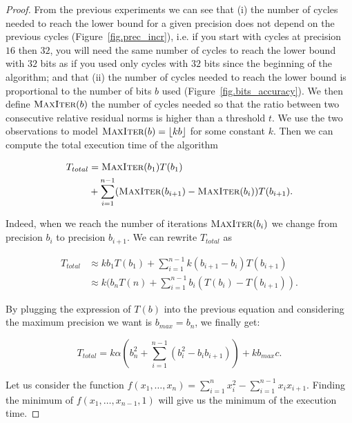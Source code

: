 \begin{proof}

    From the previous experiments we can see that (i) the number of cycles
    needed to reach the lower bound for a given precision does not depend on
    the previous cycles (Figure~\ref{fig.prec_incr}), i.e.  if you start with
    cycles at precision $16$ then $32$, you will need the same number of cycles
    to reach the lower bound with $32$ bits as if you used only cycles with
    $32$ bits since the beginning of the algorithm; and that (ii) the number of
    cycles needed to reach the lower bound is proportional to the number of
    bits $b$ used (Figure~\ref{fig.bits_accuracy}). We then define
    $\textsc{MaxIter}(b)$ the number of cycles needed so that the ratio between
    two consecutive relative residual norms is higher than a threshold $t$. We
    use the two observations to model $\textsc{MaxIter}(b) = \lfloor kb
    \rfloor$ for some constant $k$.  Then we can compute the total execution
    time of the algorithm

    \begin{align*}
        T_{total}& = \textsc{MaxIter}(b_1)T(b_1)\\ & +  \sum\limits_{i=1}^{n-1}
        (\textsc{MaxIter}(b_{i+1})-\textsc{MaxIter}(b_i))T(b_{i+1}).
    \end{align*}

    Indeed, when we reach the number of iterations $\textsc{MaxIter}(b_i)$ we
    change from precision $b_i$ to precision $b_{i+1}$.  We can rewrite
    $T_{total}$ as

    \begin{align*}
        T_{total} &\approx k b_{1} T(b_1) + \sum\limits_{i=1}^{n-1}
        k(b_{i+1}-b_{i})T(b_{i+1})\\ & \approx k ( b_{n}T(n) +
        \sum\limits_{i=1}^{n-1} b_i ( T(b_i) - T(b_{i+1})).
    \end{align*}

    By plugging the expression of $T(b)$ into the previous equation and considering
    the maximum precision we want is $b_{max}=b_n$, we finally get:

    \begin{equation}
        T_{total}  = k\alpha\left(b_n^2 + \sum\limits_{i=1}^{n-1} (b_i^2 - b_i b_{i+1})\right) + kb_{max}c.
    \end{equation}

    Let us consider the function $f(x_1,\dots,x_n) = \sum\limits_{i=1}^n x_i^2
    - \sum\limits_{i=1}^{n-1} x_ix_{i+1}$. Finding the minimum of
    $f(x_1,\dots,x_{n-1},1)$ will give us the minimum of the execution time.


\end{proof}
